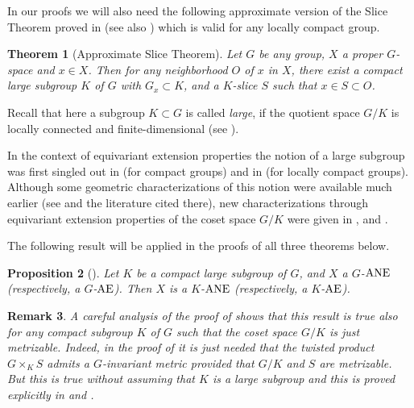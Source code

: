 \documentclass{amsart}
\newtheorem{theorem}{Theorem}[section]
\newtheorem{remark}[theorem]{Remark}
\newtheorem{proposition}[theorem]{Proposition}
\begin{document}
In our proofs we will also need  the following approximate version of the Slice Theorem  proved in  \cite[Theorem 3.6]{ant:jap} (see also \cite[Theorem 6.1]{ant:dikr})  which is valid for any locally compact group.


\begin{theorem}[Approximate Slice Theorem] \label{T:331} Let $G$ be any group, $X$  a proper $G$-space and  $x\in X$. Then for any  neighborhood $O$ of $x$ in $X$,   there exist  a   compact  large subgroup $K$ of $G$ with $G_x\subset K$, and a $K$-slice  $S$ such that  $x\in S\subset O$. 
\end{theorem}


Recall that here a subgroup $K\subset G$ is called  {\it large}, if the quotient space $G/K$ is locally connected and finite-dimensional (see \cite{ant:dikr}).


In the context of equivariant extension properties the  notion of a  large subgroup was first singled out in \cite{ant:94} (for compact groups)  and in \cite{ant:99} (for locally compact groups). Although  some geometric characterizations of this notion were available much earlier (see \cite[Section 3]{ant:dikr} and  the literature cited there), new characterizations through equivariant extension properties of the coset space $G/K$ were given in \cite[Proposition 6]{ant:99}, \cite[Proposition 3.2]{ant:jap} and \cite[Theorem 5.3]{ant:dikr}. 


\medskip


The following result will be applied in the proofs of all three theorems below.


\begin{proposition}[{\cite[Proposition 3.4]{ant:jap}}]\label{P:large} Let $K$  be a compact  large  subgroup of $G$, and $X$  a  $G$-${\rm ANE}$ (respectively, a $G$-${\rm AE}$). Then  $X$ is  a $K$-${\rm ANE}$ (respectively, a $K$-${\rm AE}$).
\end{proposition}

\begin{remark}\label{R:K}  A careful analysis of  the proof of  \cite[Proposition 3.4]{ant:jap} shows that   this result is true
also for any compact subgroup $K$ of $G$ such that the coset space $G/K$ is just metrizable. Indeed, in the proof of 
 \cite[Proposition 3.4]{ant:jap} it is just needed that the twisted product $G\times_K S$ admits a $G$-invariant metric provided that $G/K$ and $S$ are metrizable. But this is true without assuming that $K$ is a large subgroup and this is proved explicitly in  \cite[Lemma 6.5]{ant:fund09}  and  \cite[Theorem 6.1]{ant:fund09}.
\end{remark}
\end{document}
